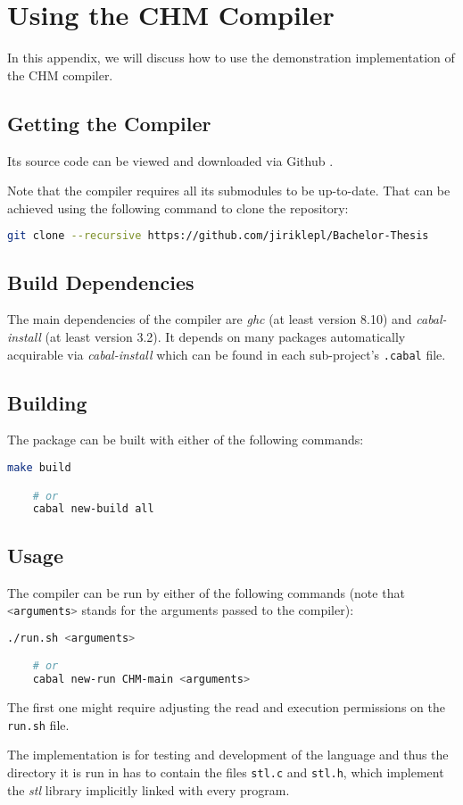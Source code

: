 \chapter{Using the CHM Compiler}

In this appendix, we will discuss how to use the demonstration implementation of the CHM compiler.

\section{Getting the Compiler}

Its source code can be viewed and downloaded via Github \cite{jiriklepl2020chmcompiler}.

Note that the compiler requires all its submodules to be up-to-date. That can be achieved using the following command to clone the repository:

\begin{lstlisting}[language=sh]
	git clone --recursive https://github.com/jiriklepl/Bachelor-Thesis
\end{lstlisting}

\section{Build Dependencies}

The main dependencies of the compiler are \emph{ghc} (at least version 8.10) and \emph{cabal-install} (at least version 3.2). It depends on many packages automatically acquirable via \emph{cabal-install} which can be found in each sub-project's \lstinline{.cabal} file.

\section{Building}

The package can be built with either of the following commands:

\begin{lstlisting}[language=sh]
	make build

	# or
	cabal new-build all
\end{lstlisting}


\section{Usage}

The compiler can be run by either of the following commands (note that \lstinline[language=sh]{<arguments>} stands for the arguments passed to the compiler):

\begin{lstlisting}[language=sh]
	./run.sh <arguments>

	# or
	cabal new-run CHM-main <arguments>
\end{lstlisting}

The first one might require adjusting the read and execution permissions on the \lstinline[language=sh]{run.sh} file.

The implementation is for testing and development of the language and thus the directory it is run in has to contain the files \lstinline[language=sh]{stl.c} and  \lstinline[language=sh]{stl.h}, which implement the \emph{stl} library implicitly linked with every program.
